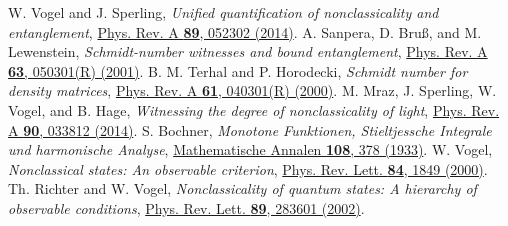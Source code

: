 \documentclass[aps,pra,twocolumn,showpacs,superscriptaddress,10pt]{revtex4-1}
\begin{document}
\begin{thebibliography}{100}
	 W. Vogel and J. Sperling, {\it Unified quantification of nonclassicality and entanglement}, \href{http://link.aps.org/doi/10.1103/PhysRevA.89.052302}{Phys. Rev. A {\bf 89}, 052302 (2014)}. 
	 A. Sanpera, D. Bru\ss{}, and M. Lewenstein, {\it Schmidt-number witnesses and bound entanglement}, \href{http://link.aps.org/doi/10.1103/PhysRevA.63.050301}{Phys. Rev. A {\bf 63}, 050301(R) (2001)}.
	 B. M. Terhal and P. Horodecki, {\it Schmidt number for density matrices}, \href{http://link.aps.org/doi/10.1103/PhysRevA.61.040301}{Phys. Rev. A {\bf 61}, 040301(R) (2000)}.
	 M. Mraz, J. Sperling, W. Vogel, and B. Hage, {\it Witnessing the degree of nonclassicality of light}, \href{http://link.aps.org/doi/10.1103/PhysRevA.90.033812}{Phys. Rev. A {\bf 90}, 033812 (2014)}.
	 S. Bochner, {\it Monotone Funktionen, Stieltjessche Integrale und harmonische Analyse}, \href{http://link.springer.com/article/10.1007/BF01452844}{Mathematische Annalen {\bf 108}, 378 (1933)}. %
%	
	 W. Vogel, {\it Nonclassical states: An observable criterion}, \href{http://link.aps.org/doi/10.1103/PhysRevLett.84.1849}{Phys. Rev. Lett. {\bf 84}, 1849 (2000)}.
	 Th. Richter and W. Vogel, {\it Nonclassicality of quantum states: A hierarchy of observable conditions}, \href{http://link.aps.org/doi/10.1103/PhysRevLett.89.283601}{Phys. Rev. Lett. {\bf 89}, 283601 (2002)}.


\end{thebibliography}
\end{document}
